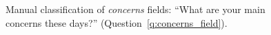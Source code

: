 \begin{figure}[h!]
    \caption[Manual classification of \textit{concerns} fields]{Manual classification of \textit{concerns} fields: ``What are your main concerns these days?'' (Question~\ref{q:concerns_field}).
    }\label{fig:concerns_field}
\end{figure}

